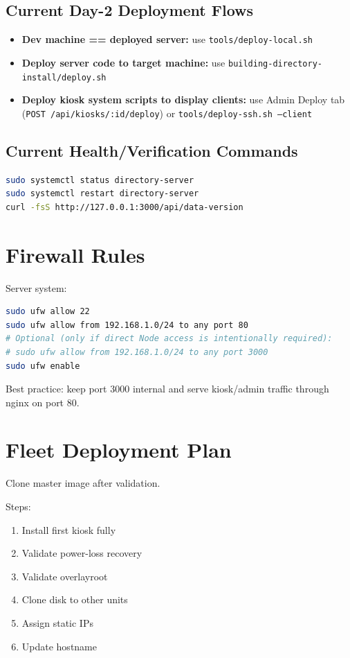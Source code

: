 \documentclass[11pt,letterpaper]{article}
\begin{document}
\subsection{Current Day-2 Deployment Flows}

\begin{itemize}
\item \textbf{Dev machine == deployed server:} use \texttt{tools/deploy-local.sh}
\item \textbf{Deploy server code to target machine:} use \texttt{building-directory-install/deploy.sh}
\item \textbf{Deploy kiosk system scripts to display clients:}
  use Admin Deploy tab (\texttt{POST /api/kiosks/:id/deploy}) or \texttt{tools/deploy-ssh.sh --client}
\end{itemize}

\subsection{Current Health/Verification Commands}

\begin{lstlisting}[language=bash]
sudo systemctl status directory-server
sudo systemctl restart directory-server
curl -fsS http://127.0.0.1:3000/api/data-version
\end{lstlisting}

\section{Firewall Rules}

Server system:

\begin{lstlisting}[language=bash]
sudo ufw allow 22
sudo ufw allow from 192.168.1.0/24 to any port 80
# Optional (only if direct Node access is intentionally required):
# sudo ufw allow from 192.168.1.0/24 to any port 3000
sudo ufw enable
\end{lstlisting}

Best practice: keep port 3000 internal and serve kiosk/admin traffic through nginx on port 80.

\section{Fleet Deployment Plan}

Clone master image after validation.

Steps:

\begin{enumerate}
\item Install first kiosk fully
\item Validate power-loss recovery
\item Validate overlayroot
\item Clone disk to other units
\item Assign static IPs
\item Update hostname
\end{enumerate}
\end{document}
